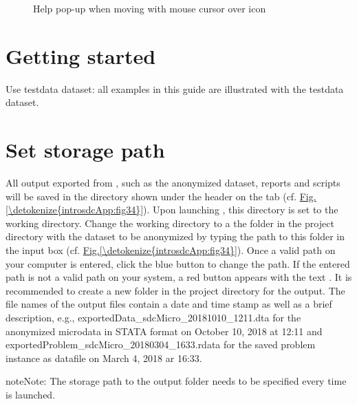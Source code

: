 \documentclass[letterpaper,10pt,english]{sphinxmanual}
\begin{document}
\begin{figure}[htbp]
\centering
\capstart

\noindent{}
\caption{Help pop-up when moving with mouse cursor over  icon}\label{\detokenize{introsdcApp:fig36}}\label{\detokenize{introsdcApp:id4}}\end{figure}


\section{Getting started}
\label{\detokenize{introsdcApp:getting-started}}
Use testdata dataset: all examples in this guide are illustrated with the testdata dataset.


\section{Set storage path}
\label{\detokenize{introsdcApp:set-storage-path}}
All output exported from , such as the anonymized dataset, reports and scripts will be
saved in the directory shown under the header  on the 
tab (cf. \hyperref[\detokenize{introsdcApp:fig34}]{Fig.\@ \ref{\detokenize{introsdcApp:fig34}}}). Upon launching , this directory is set to the  working
directory. Change the working directory to a the folder in the project directory with the
dataset to be anonymized by typing the path to this folder in the input box (cf. \hyperref[\detokenize{introsdcApp:fig34}]{Fig.\@ \ref{\detokenize{introsdcApp:fig34}}}).
Once a valid path on your computer is entered, click the blue button  to change the path. If the entered path is not a valid path on your system, a red button appears
with the text .
It is recommended to create a new folder in the project directory for the  output.
The file names of the output files contain a date and time stamp as well as a brief description,
e.g., exportedData\_sdcMicro\_20181010\_1211.dta for the anonymized microdata in STATA format
on October 10, 2018 at 12:11 and exportedProblem\_sdcMicro\_20180304\_1633.rdata for the
saved problem instance as  datafile on March 4, 2018 ar 16:33.

\begin{sphinxadmonition}{note}{Note:}
The storage path to the output folder needs to be specified every time  is
launched.
\end{sphinxadmonition}
\end{document}
